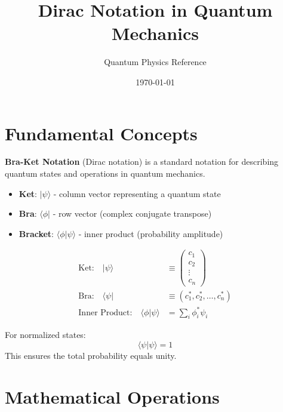 \documentclass{a3cheatsheet}
\title{Dirac Notation in Quantum Mechanics}
\author{Quantum Physics Reference}
\date{\today}
\begin{document}

\begin{multicols}{3}

\section{Fundamental Concepts}

\begin{infobox}
\textbf{Bra-Ket Notation} (Dirac notation) is a standard notation for describing quantum states and operations in quantum mechanics.
\end{infobox}

\begin{itemize}
    \item \textbf{Ket}: $|\psi\rangle$ - column vector representing a quantum state
    \item \textbf{Bra}: $\langle\phi|$ - row vector (complex conjugate transpose)
    \item \textbf{Bracket}: $\langle\phi|\psi\rangle$ - inner product (probability amplitude)
\end{itemize}

\begin{formulabox}
\begin{align}
\text{Ket:} \quad |\psi\rangle &\equiv \begin{pmatrix} c_1 \\ c_2 \\ \vdots \\ c_n \end{pmatrix} \\
\text{Bra:} \quad \langle\psi| &\equiv (c_1^*, c_2^*, \ldots, c_n^*) \\
\text{Inner Product:} \quad \langle\phi|\psi\rangle &= \sum_i \phi_i^* \psi_i
\end{align}
\end{formulabox}

\begin{notebox}[Normalization]
For normalized states:
$$\langle\psi|\psi\rangle = 1$$
This ensures the total probability equals unity.
\end{notebox}

\section{Mathematical Operations}


\end{multicols}
\end{document}

